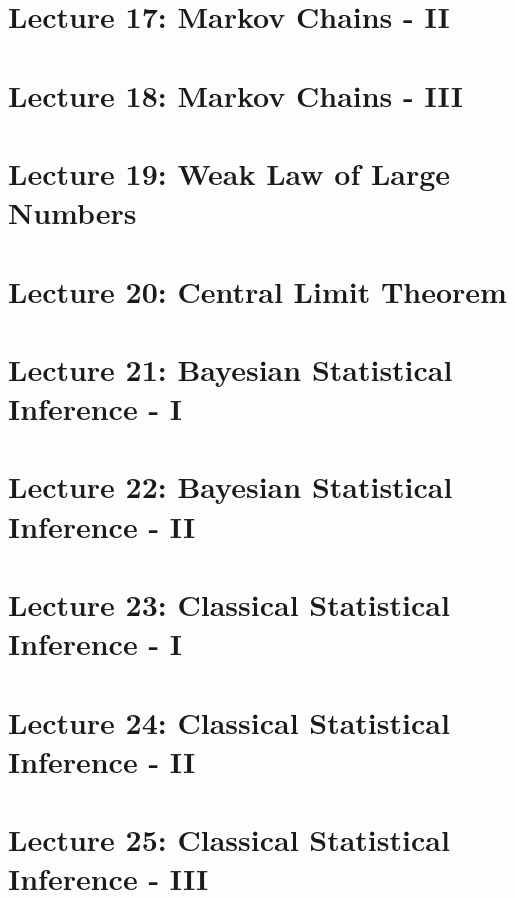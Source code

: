 \documentclass{article}
\begin{document}


\section{Lecture 17: Markov Chains - II}



\section{Lecture 18: Markov Chains - III}



\section{Lecture 19: Weak Law of Large Numbers}



\section{Lecture 20: Central Limit Theorem}



\section{Lecture 21: Bayesian Statistical Inference - I}



\section{Lecture 22: Bayesian Statistical Inference - II}



\section{Lecture 23: Classical Statistical Inference - I}



\section{Lecture 24: Classical Statistical Inference - II}




\section{Lecture 25: Classical Statistical Inference - III}


\end{document}
